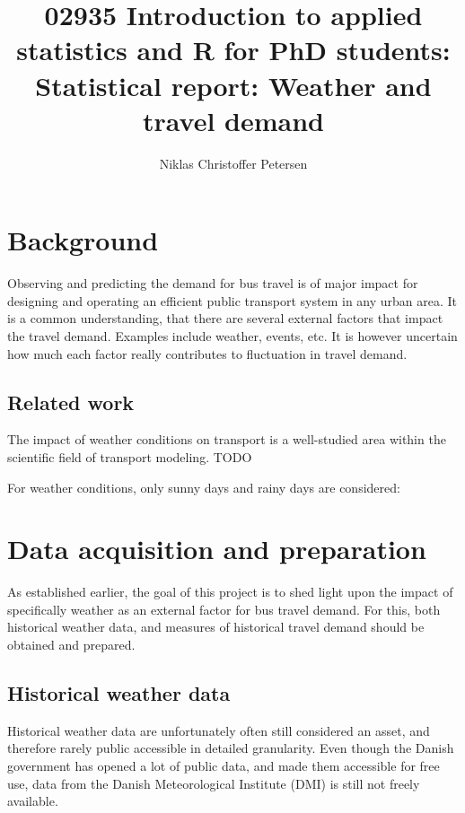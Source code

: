 \documentclass[a4paper,11pt]{article}
\title{{\small 02935 Introduction to applied statistics and R for PhD students: }\\[1em]Statistical report: Weather and travel demand}
\author{Niklas Christoffer Petersen}
\affil{Transport Modelling, Department of Management Engineering \\ Technical University of Denmark, 2800 Kongens Lyngby, Denmark}
\begin{document}
\singlespace
\maketitle
\thispagestyle{empty}
\clearpage

\onehalfspacing
{}
\tableofcontents
\clearpage

\section{Background}\label{ch:background}

Observing and predicting the demand for bus travel is of major impact for designing and operating an efficient public transport system in any urban area. It is a common understanding, that there are several external factors that impact the travel demand. Examples include weather, events, etc. It is however uncertain how much each factor really contributes to fluctuation in travel demand. 

\subsection{Related work}\label{ch:relatedWork}
The impact of weather conditions on transport is a well-studied area within the scientific field of transport modeling.
TODO

For weather conditions, only sunny days and rainy days are considered: \citet{Yo2010}
\clearpage

\section{Data acquisition and preparation}\label{ch:data}
As established earlier, the goal of this project is to shed light upon the impact of specifically weather as an external factor for bus travel demand. For this, both historical weather data, and measures of historical travel demand should be obtained and prepared.

\subsection{Historical weather data}\label{ch:data_weather}
Historical weather data are unfortunately often still considered an asset, and therefore rarely public accessible in detailed granularity. Even though the Danish government has opened a lot of public data, and made them accessible for free use, data from the Danish Meteorological Institute (DMI) is still not freely available.
\end{document}
